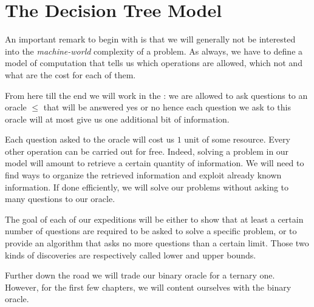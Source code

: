 \section{The Decision Tree Model}
\label{tree:sorting:model}

An important remark to begin with is that we will generally not be interested
into the \emph{machine-world} complexity of a problem. As always, we have to
define a model of computation that tells us which operations are allowed, which
not and what are the cost for each of them.

From here till the end we will work in the :
we are allowed to ask questions to an oracle \(\le\) that will be answered yes or
no hence each question we ask to this oracle will at most give us one
additional bit of information.

Each question asked to the oracle will cost us $1$ unit of some resource.
Every other operation can be carried out for free. Indeed, solving a problem in
our model will amount to retrieve a certain quantity of information. We will
need to find ways to organize the retrieved information and exploit already
known information. If done efficiently, we will solve our problems without
asking to many questions to our oracle.

The goal of each of our expeditions will be either to show that at least a
certain number of questions are required to be asked to solve a specific
problem, or to provide an algorithm that asks no more questions than a certain
limit. Those two kinds of discoveries are respectively called lower and upper
bounds.

Further down the road we will trade our binary oracle for a
ternary one. However, for the first few chapters, we will content ourselves
with the binary oracle.
